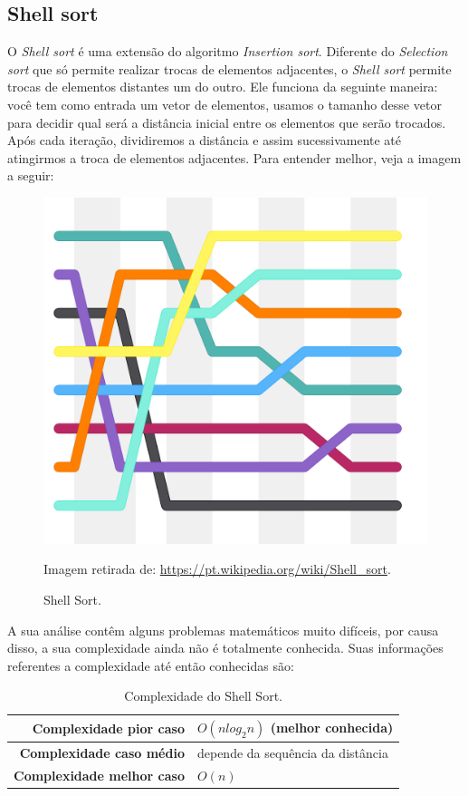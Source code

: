 \subsection{Shell sort}
O \textit{Shell sort} é uma extensão do algoritmo \textit{Insertion sort}. Diferente do \textit{Selection sort} que só permite realizar trocas de elementos adjacentes, o \textit{Shell sort} permite trocas de elementos distantes um do outro. Ele funciona da seguinte maneira: você tem como entrada um vetor de elementos, usamos o tamanho desse vetor para decidir qual será a distância inicial entre os elementos que serão trocados. Após cada iteração, dividiremos a distância e assim sucessivamente até atingirmos a troca de elementos adjacentes. Para entender melhor, veja a imagem a seguir:

\begin{figure}[!htb]
	\centering
	\includegraphics{img/shell-sort.png}
	\caption{Shell Sort.}
	\small{Imagem retirada de: \url{https://pt.wikipedia.org/wiki/Shell_sort}.}
	\label{shell-sort}
\end{figure}

A sua análise contêm alguns problemas matemáticos muito difíceis, por causa disso, a sua complexidade ainda não é totalmente conhecida. Suas informações referentes a complexidade até então conhecidas são:

\begin{table}[H]
 \centering
	\begin{tabular}{| r | l |}
		\hline
		\textbf{Complexidade pior caso}   & $O(nlog_{2}n)$ (melhor conhecida) \\
		\hline
		\textbf{Complexidade caso médio}  & depende da sequência da distância \\
		\hline
		\textbf{Complexidade melhor caso} & $O(n)$ \\
		\hline
	\end{tabular}
	\caption{Complexidade do Shell Sort.}
	\label{t_shell_sort}
\end{table}

